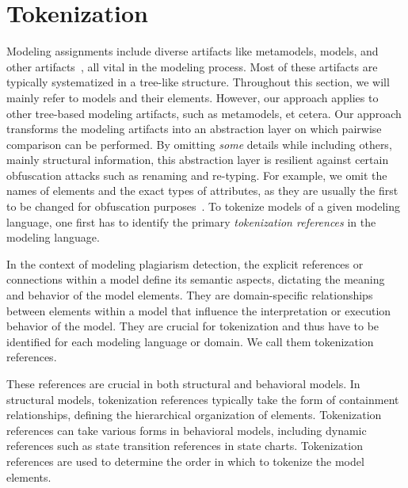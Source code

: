 
\section{Tokenization}\label{subsec:tokenization}


\noindent
Modeling assignments include diverse artifacts like metamodels, models, and other artifacts~\cite{Ciccozzi2018}, all vital in the modeling process.
Most of these artifacts are typically systematized in a tree-like structure. Throughout this section, we will mainly refer to models and their elements. However, our approach applies to other tree-based modeling artifacts, such as metamodels, et cetera.
%
Our approach transforms the modeling artifacts into an abstraction layer on which pairwise comparison can be performed. By omitting \textit{some} details while including others, mainly structural information, this abstraction layer is resilient against certain obfuscation attacks such as renaming and re-typing.
For example, we omit the names of elements and the exact types of attributes, as they are usually the first to be changed for obfuscation purposes~\cite{Saglam2022, Saglam2023}.
%
To tokenize models of a given modeling language, one first has to identify the primary \textit{tokenization references} in the modeling language.
%
\begin{concept}\label{def:semantic-ref}
    In the context of modeling plagiarism detection, the explicit references or connections within a model define its semantic aspects, dictating the meaning and behavior of the model elements. They are domain-specific relationships between elements within a model that influence the interpretation or execution behavior of the model. They are crucial for tokenization and thus have to be identified for each modeling language or domain. We call them tokenization references.
\end{concept}
%
These references are crucial in both structural and behavioral models. In structural models, tokenization references typically take the form of containment relationships, defining the hierarchical organization of elements. 
Tokenization references can take various forms in behavioral models, including dynamic references such as state transition references in state charts. Tokenization references are used to determine the order in which to tokenize the model elements.

